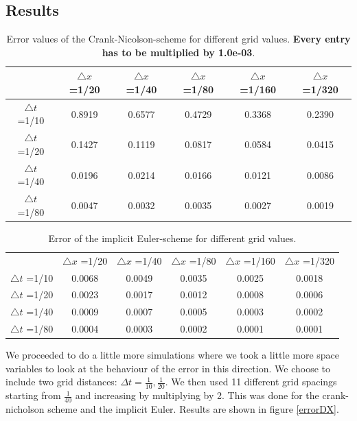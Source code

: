 \documentclass[ twoside,openright,titlepage,numbers=noenddot,headinclude,%
                footinclude=true,cleardoublepage=empty,abstractoff, %
                BCOR=5mm,paper=a4,fontsize=11pt,%
                ngerman,american,%
                ]{scrreprt}
\begin{document}
\subsection{Results}
\begin{table}
\begin{tabular}{|c|c|c|c|c|c|} \hline
			  & $\triangle x$ =1/20&$\triangle x$ =1/40&$\triangle x$ =1/80&$\triangle x$ =1/160&$\triangle x$ =1/320 \\ \hline 
$\triangle t$ =1/10	  & 0.8919 &   0.6577 &   0.4729 &   0.3368 &   0.2390	\\ 
$\triangle t$ =1/20	  & 0.1427 &   0.1119 &   0.0817 &   0.0584 &   0.0415	\\
$\triangle t$ =1/40	  & 0.0196 &   0.0214 &   0.0166 &   0.0121 &   0.0086	\\
$\triangle t$ =1/80 	  & 0.0047 &   0.0032 &   0.0035 &   0.0027 &   0.0019	\\ \hline
\end{tabular}
\caption{Error values of the Crank-Nicolson-scheme for different grid values. \textbf{Every entry has to be multiplied by 1.0e-03}.}
\label{tab:CN}
\end{table}
\begin{table}
\begin{tabular}{|c|c|c|c|c|c|} \hline
	& $\triangle x$ =1/20&$\triangle x$ =1/40&$\triangle x$ =1/80&$\triangle x$ =1/160&$\triangle x$ =1/320 \\
$\triangle t$ =1/10	& 0.0068  &  0.0049  &  0.0035  &  0.0025  &  0.0018 \\
$\triangle t$ =1/20	& 0.0023  &  0.0017  &  0.0012  &  0.0008  &  0.0006 \\
$\triangle t$ =1/40	& 0.0009  &  0.0007  &  0.0005  &  0.0003  &  0.0002 \\
$\triangle t$ =1/80	& 0.0004  &  0.0003  &  0.0002  &  0.0001  &  0.0001 \\ \hline
\end{tabular}
\caption{Error of the implicit Euler-scheme for different grid values.}
\label{tab:IE}
\end{table}
We proceeded to do a little more simulations where we took a little more space variables to look at the behaviour of the error in this direction. We choose to include two grid distances: $\Delta t = \frac{1}{10},\frac{1}{20}$. We then used 11 different grid spacings starting from $\frac{1}{40}$ and increasing by multiplying by 2. This was done for the crank-nicholson scheme and the implicit Euler. Results are shown in figure \ref{errorDX}.
\end{document}
